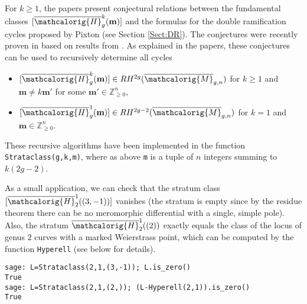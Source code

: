 \documentclass[11pt]{article}
\newcommand{\M}{\ensuremath{\overline{\mathcalorig{M}}}}
\begin{document}
For $k \geq 1$, the papers \cite{FP, SchmittDimension} present conjectural relations between the fundamental classes $[\overline{\mathcalorig{H}}_g^k(\textbf{m})]$ and the formulas for the double ramification cycles proposed by Pixton (see Section \ref{Sect:DR}). 
The conjectures were recently proven in \cite{bhpss} based on results from \cite{pluricanonical}.
As explained in the papers, these conjectures can be used to recursively determine all cycles
\begin{itemize}
    \item $[\overline{\mathcalorig{H}}_g^k(\textbf{m})] \in RH^{2g}(\M_{g,n})$ for $k \geq 1$ and $\textbf{m} \neq k \textbf{m}'$ for some $\textbf{m}' \in \mathbb{Z}_{\geq 0}^n$,
    \item $[\overline{\mathcalorig{H}}_g^1(\textbf{m})] \in RH^{2g-2}(\M_{g,n})$ for $k = 1$ and $\textbf{m}  \in \mathbb{Z}_{\geq 0}^n$.
\end{itemize}
These recursive algorithms have been implemented in the function \texttt{Strataclass(g,k,m)}, where as above \texttt{m} is a tuple of $n$ integers summing to $k(2g-2)$.

As a small application, we can check that the stratum class $[\overline{\mathcalorig{H}}_2^1((3,-1))]$ vanishes (the stratum is empty since by the residue theorem there can be no meromorphic differential with a single, simple pole). Also, the stratum $\overline{\mathcalorig{H}}_2^1((2))$ exactly equals the class of the locus of genus $2$ curves with a marked Weierstrass point, which can be computed by the function \texttt{Hyperell} (see below for details).
\begin{lstlisting}
sage: L=Strataclass(2,1,(3,-1)); L.is_zero()
True
sage: L=Strataclass(2,1,(2,)); (L-Hyperell(2,1)).is_zero()
True
\end{lstlisting}
\end{document}
